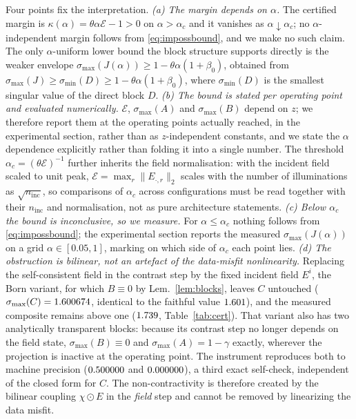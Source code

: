 \documentclass[journal,cmes,article,submit,moreauthors,pdftex]{Definitions/tsp}
\newcommand{\numv}[1]{#1}
\begin{document}
Four points fix the interpretation. \emph{(a) The margin depends on $\alpha$.} The certified margin
is $\kappa(\alpha)=\theta\alpha\mathcal{E}-1>0$ on $\alpha>\alpha_c$ and it vanishes as
$\alpha\downarrow\alpha_c$; no $\alpha$-independent margin follows from
\eqref{eq:impossbound}, and we make no such claim. The only $\alpha$-uniform lower bound the block
structure supports directly is the weaker envelope
$\sigma_{\max}(J(\alpha))\ge1-\theta\alpha(1+\beta_0)$, obtained from
$\sigma_{\max}(J)\ge\sigma_{\min}(D)\ge1-\theta\alpha(1+\beta_0)$, where
$\sigma_{\min}(D)$ is the smallest singular value of the direct block $D$. \emph{(b) The bound is stated
per operating point and evaluated numerically.} $\mathcal{E}$, $\sigma_{\max}(A)$ and
$\sigma_{\max}(B)$ depend on $z$; we therefore report them at the operating points actually reached,
in the experimental section, rather than as $z$-independent constants, and we state the $\alpha$
dependence explicitly rather than folding it into a single number. The threshold
$\alpha_c=(\theta\mathcal{E})^{-1}$ further inherits the field normalisation: with the incident field
scaled to unit peak, $\mathcal{E}=\max_r\|E_{\cdot,r}\|_2$ scales with the number of illuminations as
$\sqrt{n_{\mathrm{inc}}}$, so comparisons of $\alpha_c$ across configurations must be read together
with their $n_{\mathrm{inc}}$ and normalisation, not as pure architecture statements. \emph{(c) Below $\alpha_c$ the
bound is inconclusive, so we measure.} For $\alpha\le\alpha_c$ nothing follows from
\eqref{eq:impossbound}; the experimental section reports the measured
$\sigma_{\max}(J(\alpha))$ on a grid $\alpha\in[0.05,1]$, marking on which side of $\alpha_c$ each
point lies. \emph{(d) The obstruction is bilinear, not an artefact of the data-misfit
nonlinearity.} Replacing the self-consistent field in the contrast step by the fixed incident field
$E^i$, the Born variant, for which $B\equiv0$ by Lem.~\ref{lem:blocks}, leaves $C$ untouched
($\sigma_{\max}(C)=\numv{\NumBornSigmaC}$, identical to the faithful value $\numv{\NumSigCLower}$),
and the measured composite remains above one ($\numv{\NumBornSigmaFull}$, Table~\ref{tab:cert}).
That variant also has two analytically transparent blocks: because its contrast step no longer
depends on the field state, $\sigma_{\max}(B)\equiv0$ and $\sigma_{\max}(A)=1-\gamma$ exactly, wherever the projection is inactive at the operating point. The instrument reproduces both to
machine precision ($\numv{\NumBornSigmaA}$ and $\numv{\NumBornSigmaB}$), a third exact
self-check, independent of the closed form for $C$. The non-contractivity is therefore created by
the bilinear coupling $\chi\odot E$ in the \emph{field} step and cannot be removed by linearizing
the data misfit.
\end{document}
